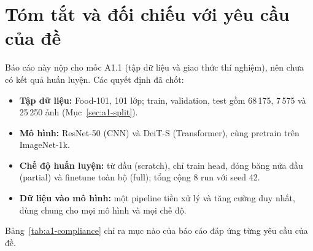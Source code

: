 \section{Tóm tắt và đối chiếu với yêu cầu của đề}\label{sec:a1-summary}
Báo cáo này nộp cho mốc A1.1 (tập dữ liệu và giao thức thí nghiệm), nên chưa có kết quả huấn luyện. Các quyết định đã chốt:
\begin{itemize}
\item \textbf{Tập dữ liệu:} Food-101, 101 lớp; train, validation, test gồm 68\,175, 7\,575 và 25\,250 ảnh (Mục~\ref{sec:a1-split}).
\item \textbf{Mô hình:} ResNet-50 (CNN) và DeiT-S (Transformer), cùng pretrain trên ImageNet-1k.
\item \textbf{Chế độ huấn luyện:} từ đầu (scratch), chỉ train head, đóng băng nửa đầu (partial) và finetune toàn bộ (full); tổng cộng 8 run với seed 42.
\item \textbf{Dữ liệu vào mô hình:} một pipeline tiền xử lý và tăng cường duy nhất, dùng chung cho mọi mô hình và mọi chế độ.
\end{itemize}
Bảng~\ref{tab:a1-compliance} chỉ ra mục nào của báo cáo đáp ứng từng yêu cầu của đề.

